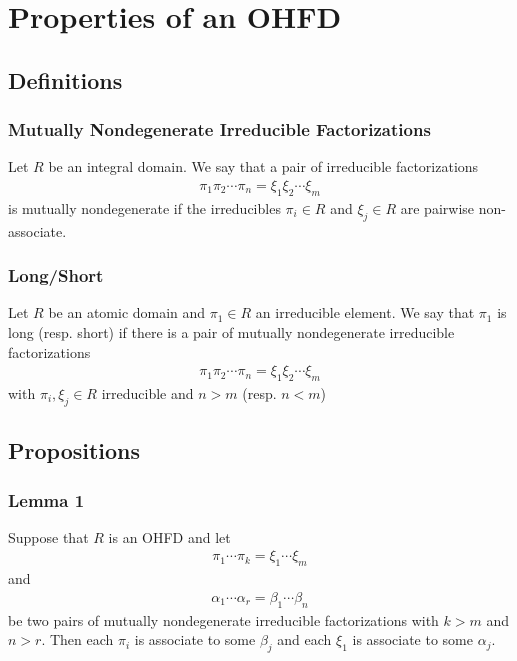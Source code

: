 \section{Properties of an OHFD}

\subsection{Definitions}

\begin{frame}
  \frametitle{Mutually Nondegenerate Irreducible Factorizations}
  \begin{definition}
    Let $R$ be an integral domain. We say that a pair of irreducible factorizations
    \begin{align*}
      \pi_1\pi_2\cdots\pi_n = \xi_1\xi_2\cdots\xi_m
    \end{align*}
    is \alert{mutually nondegenerate} if the irreducibles $\pi_i \in R$ and $\xi_j \in R$ are pairwise non-associate.
  \end{definition}
\end{frame}

\begin{frame}
  \frametitle{Long/Short}
  \begin{definition}
    Let $R$ be an atomic domain and $\pi_1 \in R$ an irreducible element.
    We say that $\pi_1$ is \alert{long} (resp. \alert{short}) if there is a pair of mutually nondegenerate irreducible factorizations
    \begin{align*}
      \pi_1\pi_2\cdots\pi_n = \xi_1\xi_2\cdots \xi_m
    \end{align*}
    with $\pi_i, \xi_j \in R$ irreducible and $n > m$ (resp. $n<m$)
  \end{definition}
\end{frame}

\subsection{Propositions}

\begin{frame}
  \frametitle{Lemma 1}
  \begin{lemma}
    Suppose that $R$ is an OHFD and let
    \begin{align*}
      \pi_1\cdots\pi_k=\xi_1\cdots\xi_m
    \end{align*}
    and
    \begin{align*}
      \alpha_1\cdots\alpha_r=\beta_1\cdots\beta_n
    \end{align*}
    be two pairs of mutually nondegenerate irreducible factorizations with $k>m$ and $n>r$.
    Then each $\pi_i$ is associate to some $\beta_j$ and each $\xi_1$ is associate to some $\alpha_j$. 
  \end{lemma}
\end{frame}


